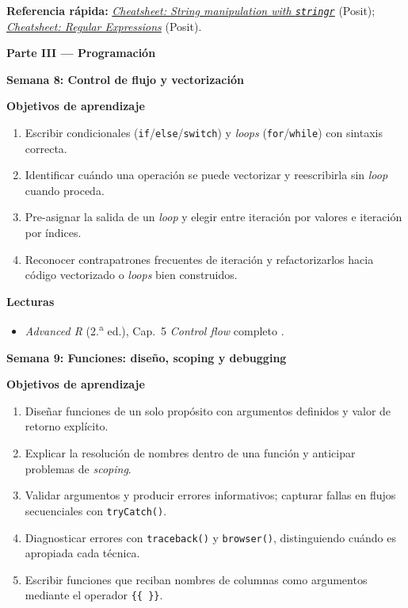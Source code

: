 \documentclass[11pt,letterpaper]{article}
\newcommand{\parteCurso}[1]{%
  \clearpage%
  \vspace*{0.5cm}%
  {\centering\color{main}\fontsize{26pt}{32pt}\selectfont\bfseries #1\par}%
  \vspace{0.8cm}%
}
\newcommand{\semana}[2]{%
  \bigskip%
  {\color{main}\Large\bfseries Semana #1: #2\par}%
  \smallskip%
}
\newcommand{\cheatsheet}[2]{%
  \href{https://rstudio.github.io/cheatsheets/#1.pdf}{\textit{Cheatsheet: #2}}%
}
\begin{document}
\medskip
\noindent\textbf{Referencia rápida:} \cheatsheet{strings}{String manipulation with \texttt{stringr}} (Posit); \cheatsheet{regex}{Regular Expressions} (Posit).

\parteCurso{Parte III --- Programación}

\semana{8}{Control de flujo y vectorización}

\medskip
\noindent\textbf{Objetivos de aprendizaje}
\begin{enumerate}[leftmargin=*, itemsep=1pt]
    \item Escribir condicionales (\texttt{if}/\texttt{else}/\texttt{switch}) y \textit{loops} (\texttt{for}/\texttt{while}) con sintaxis correcta.
    \item Identificar cuándo una operación se puede vectorizar y reescribirla sin \textit{loop} cuando proceda.
    \item Pre-asignar la salida de un \textit{loop} y elegir entre iteración por valores e iteración por índices.
    \item Reconocer contrapatrones frecuentes de iteración y refactorizarlos hacia código vectorizado o \textit{loops} bien construidos.
\end{enumerate}

\medskip
\noindent\textbf{Lecturas}
\begin{itemize}[leftmargin=*, itemsep=1pt]
    \item \textit{Advanced R} (2.\textsuperscript{a} ed.), Cap.\ 5 \textit{Control flow} completo \cite{wickham2019advr}.
\end{itemize}

\semana{9}{Funciones: diseño, scoping y debugging}

\medskip
\noindent\textbf{Objetivos de aprendizaje}
\begin{enumerate}[leftmargin=*, itemsep=1pt]
    \item Diseñar funciones de un solo propósito con argumentos definidos y valor de retorno explícito.
    \item Explicar la resolución de nombres dentro de una función y anticipar problemas de \textit{scoping}.
    \item Validar argumentos y producir errores informativos; capturar fallas en flujos secuenciales con \texttt{tryCatch()}.
    \item Diagnosticar errores con \texttt{traceback()} y \texttt{browser()}, distinguiendo cuándo es apropiada cada técnica.
    \item Escribir funciones que reciban nombres de columnas como argumentos mediante el operador \texttt{\{\{~\}\}}.
\end{enumerate}
\end{document}
